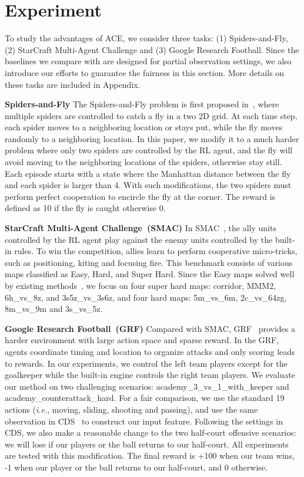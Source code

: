 \documentclass[letterpaper]{article} \usepackage{aaai23}  \usepackage{times}  \usepackage{helvet}  \usepackage{courier}  \usepackage[hyphens]{url}  \usepackage{graphicx} \urlstyle{rm} \def\UrlFont{\rm}  \usepackage{natbib}  \usepackage{caption} \frenchspacing  \setlength{\pdfpagewidth}{8.5in} \setlength{\pdfpageheight}{11in} \usepackage{algorithm}
\begin{document}
 \section{Experiment}

To study the advantages of ACE, we consider three tasks: (1) Spiders-and-Fly, (2) StarCraft Multi-Agent Challenge and (3) Google Research Football. Since the baselines we compare with are designed for partial observation settings, we also introduce our efforts to guarantee the fairness in this section. More details on these tasks are included in Appendix.

\textbf{Spiders-and-Fly} The Spiders-and-Fly problem is first proposed in~\citeyear{multiagent_rollout}, where multiple spiders are controlled to catch a fly in a two 2D grid. At each time step, each spider moves to a neighboring location or stays put, while the fly moves randomly to a neighboring location. In this paper, we modify it to a much harder problem where only two spiders are controlled by the RL agent, and the fly will avoid moving to the neighboring locations of the spiders, otherwise stay still. Each episode starts with a state where the Manhattan distance between the fly and each spider is larger than 4. With such modifications, the two spiders must perform perfect cooperation to encircle the fly at the corner. The reward is defined as 10 if the fly is caught otherwise 0. 

\textbf{StarCraft Multi-Agent Challenge~(SMAC)}
In SMAC~\citeyear{smac}, the ally units controlled by the RL agent play against the enemy units controlled by the built-in rules. To win the competition, allies learn to perform cooperative micro-tricks, such as positioning, kiting and focusing fire. This benchmark consists of various maps classified as Easy, Hard, and Super Hard. Since the Easy maps solved well by existing methods~\citeyear{pymarl2}, we focus on four super hard maps: corridor, MMM2, 6h\_vs\_8z, and 3s5z\_vs\_3s6z, and four hard maps: 5m\_vs\_6m, 2c\_vs\_64zg, 8m\_vs\_9m and 3s\_vs\_5z. 

\textbf{Google Research Football~(GRF)}
Compared with SMAC, GRF~\citeyear{grf} provides a harder environment with large action space and sparse reward. 
In the GRF, agents coordinate timing and location to organize attacks and only scoring leads to rewards. In our experiments, we control the left team players except for the goalkeeper while the built-in engine controls the right team players. 
We evaluate our method on two challenging scenarios: academy\_3\_vs\_1\_with\_keeper and academy\_counterattack\_hard.
For a fair comparison, we use the standard 19 actions (\textit{i.e.}, moving, sliding, shooting and passing), and use the same observation in CDS~\citeyear{cds} to construct our input feature. Following the settings in CDS, we also make a reasonable change to the two half-court offensive scenarios: we will lose if our players or the ball returns to our half-court. All experiments are tested with this modification. 
The final reward is +100 when our team wins, -1 when our player or the ball returns to our half-court, and 0 otherwise.
\end{document}
